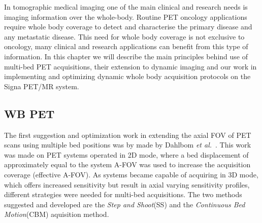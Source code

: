 In tomographic medical imaging one of the main clinical and research needs is imaging information over the whole-body. Routine PET oncology applications require whole body coverage to detect and characterise the primary disease and any metastatic disease. This need for whole body coverage is not exclusive to oncology, many clinical and research applications can benefit from this type of information. In this chapter we will describe the main principles behind use of multi-bed PET acquisitions, their extension to dynamic imaging and our work in implementing and optimizing dynamic whole body acquisition protocols on the Signa PET/MR system. 

\subsection{WB PET}
The first suggestion and optimization work in extending the axial FOV of PET scans using multiple bed positions was by made by Dahlbom \textit{et al.}~\cite{Dahlbom1992}. This work was made on PET systems operated in 2D mode, where a bed displacement of approximately equal to the system A-FOV was used to increase the acquisition coverage (effective A-FOV). As systems became capable of acquiring in 3D mode, which offers increased sensitivity but result in axial varying sensitivity profiles, different strategies were needed for multi-bed acquisitions. The two methods suggested and developed are the \textit{Step and Shoot}(SS) and the \textit{Continuous Bed Motion}(CBM) aquisition method. 


